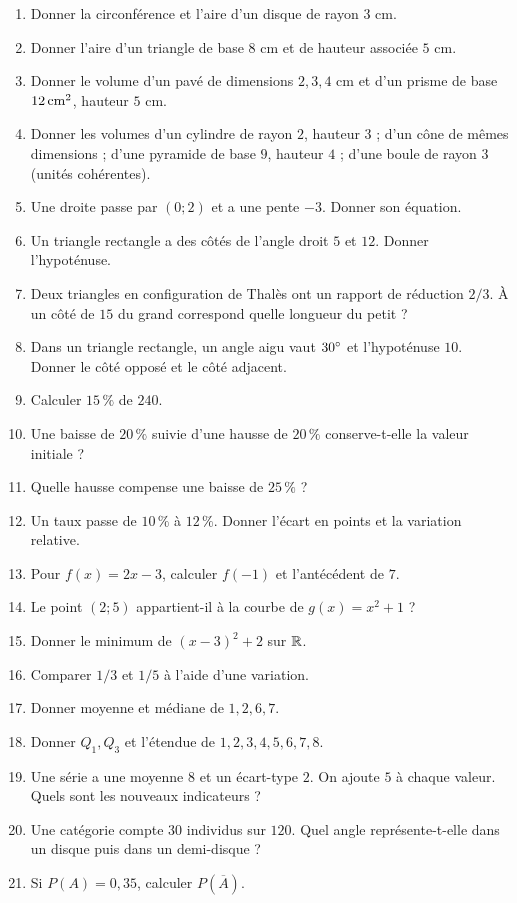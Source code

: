 \documentclass[11pt,a4paper,oneside]{book}
\begin{document}
\begin{enumerate}
\item Donner la circonférence et l'aire d'un disque de rayon $3$ cm.
\item Donner l'aire d'un triangle de base $8$ cm et de hauteur associée $5$ cm.
\item Donner le volume d'un pavé de dimensions $2,3,4$ cm et d'un prisme de base $12\,\mathrm{cm^2}$, hauteur $5$ cm.
\item Donner les volumes d'un cylindre de rayon $2$, hauteur $3$ ; d'un cône de mêmes dimensions ; d'une pyramide de base $9$, hauteur $4$ ; d'une boule de rayon $3$ (unités cohérentes).
\item Une droite passe par $(0;2)$ et a une pente $-3$. Donner son équation.
\item Un triangle rectangle a des côtés de l'angle droit $5$ et $12$. Donner l'hypoténuse.
\item Deux triangles en configuration de Thalès ont un rapport de réduction $2/3$. À un côté de $15$ du grand correspond quelle longueur du petit ?
\item Dans un triangle rectangle, un angle aigu vaut $30^{\circ}$ et l'hypoténuse $10$. Donner le côté opposé et le côté adjacent.
\item Calculer $15\,\%$ de $240$.
\item Une baisse de $20\,\%$ suivie d'une hausse de $20\,\%$ conserve-t-elle la valeur initiale ?
\item Quelle hausse compense une baisse de $25\,\%$ ?
\item Un taux passe de $10\,\%$ à $12\,\%$. Donner l'écart en points et la variation relative.
\item Pour $f(x)=2x-3$, calculer $f(-1)$ et l'antécédent de $7$.
\item Le point $(2;5)$ appartient-il à la courbe de $g(x)=x^2+1$ ?
\item Donner le minimum de $(x-3)^2+2$ sur $\mathbb{R}$.
\item Comparer $1/3$ et $1/5$ à l'aide d'une variation.
\item Donner moyenne et médiane de $1,2,6,7$.
\item Donner $Q_1,Q_3$ et l'étendue de $1,2,3,4,5,6,7,8$.
\item Une série a une moyenne $8$ et un écart-type $2$. On ajoute $5$ à chaque valeur. Quels sont les nouveaux indicateurs ?
\item Une catégorie compte $30$ individus sur $120$. Quel angle représente-t-elle dans un disque puis dans un demi-disque ?
\item Si $P(A)=0{,}35$, calculer $P(\overline A)$.

\end{enumerate}
\end{document}
